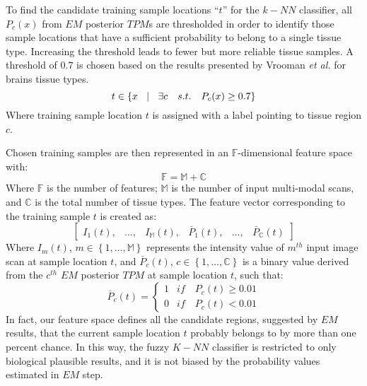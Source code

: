 To find the candidate training sample locations ``$t$'' for the $k-NN$ classifier, all $P_c(x)$ from $EM$ posterior $TPM$s are thresholded in order to identify those sample locations that have a sufficient probability to belong to a single tissue type. Increasing the threshold leads to fewer but more reliable tissue samples. A threshold of $0.7$ is chosen based on the results presented by Vrooman \emph{et al.}\cite{Vrooman2007} for brains tissue types.
\begin{equation}
t\in \left\{ x\quad \vline \quad \exists c \quad s.t. \quad P_c(x)\geq 0.7\right\}
\end{equation}
Where training sample location $t$ is assigned with a label pointing to tissue region $c$.

Chosen training samples are then represented in an $\mathbb{F}$-dimensional feature space with:
\begin{equation}
\mathbb{F}=\mathbb{M}+\mathbb{C}
\end{equation}
Where $\mathbb{F}$ is the number of features; $\mathbb{M}$ is the number of input multi-modal scans, and $\mathbb{C}$ is the total number of tissue types.
The feature vector corresponding to the training sample $t$ is created as:
\begin{equation} \label{eq:fvec}
\begin{bmatrix}
I_{1}(t), & ..., & I_{\mathbb{M}}(t), & \breve{P_1}(t), & ..., & \breve{P_{\mathbb{C}}}(t)
\end{bmatrix}
\end{equation}
Where $I_{m}(t)$, $m\in \left\{1,\ldots, \mathbb{M}\right\}$ represents the intensity value of $m^{th}$ input image scan at sample location $t$, and $\breve{P_c}(t)$, $c\in \left\{1,\ldots, \mathbb{C}\right\}$ is a binary value derived from the $c^{th}$ $EM$ posterior $TPM$ at sample location $t$, such that:
\begin{equation}
\breve{P_c}(t) = \left\{\begin{matrix}
1 & if \quad P_c(t) \geq 0.01 \\
0 & if \quad P_c(t) <  0.01
\end{matrix}\right.
\end{equation}
In fact, our feature space defines all the candidate regions, suggested by $EM$ results, that the current sample location $t$ probably belongs to by more than one percent chance. In this way, the fuzzy $K-NN$ classifier is restricted to only biological plausible results, and it is not biased by the probability values estimated in $EM$ step.

